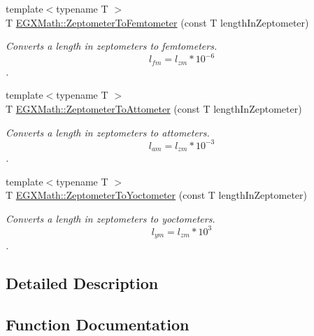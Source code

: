 \begin{DoxyCompactItemize}
{\footnotesize template$<$typename T $>$ }\\T \mbox{\hyperlink{group___e_g_x_math-_conversions-_length_conversions-_zeptometer-_s_i_ga8975921335cca63259a2c02edfb39c00}{E\+G\+X\+Math\+::\+Zeptometer\+To\+Femtometer}} (const T length\+In\+Zeptometer)
\begin{DoxyCompactList}\small\item\em Converts a length in zeptometers to femtometers. \[ l_{fm}=l_{zm} * 10^{-6} \]. \end{DoxyCompactList}\item 
{\footnotesize template$<$typename T $>$ }\\T \mbox{\hyperlink{group___e_g_x_math-_conversions-_length_conversions-_zeptometer-_s_i_ga390ab639bca5b294d985e94d756368c5}{E\+G\+X\+Math\+::\+Zeptometer\+To\+Attometer}} (const T length\+In\+Zeptometer)
\begin{DoxyCompactList}\small\item\em Converts a length in zeptometers to attometers. \[ l_{am}=l_{zm} * 10^{-3} \]. \end{DoxyCompactList}\item 
{\footnotesize template$<$typename T $>$ }\\T \mbox{\hyperlink{group___e_g_x_math-_conversions-_length_conversions-_zeptometer-_s_i_ga0477d1a8cb246721ce00cfd7b73d5c9e}{E\+G\+X\+Math\+::\+Zeptometer\+To\+Yoctometer}} (const T length\+In\+Zeptometer)
\begin{DoxyCompactList}\small\item\em Converts a length in zeptometers to yoctometers. \[ l_{ym}=l_{zm} * 10^{3} \]. \end{DoxyCompactList}\end{DoxyCompactItemize}


\subsection{Detailed Description}


\subsection{Function Documentation}
\mbox{\label{group___e_g_x_math-_conversions-_length_conversions-_zeptometer-_s_i_ga390ab639bca5b294d985e94d756368c5}} 
